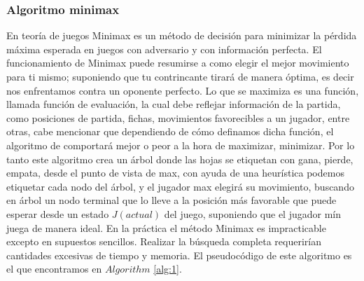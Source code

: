 \documentclass[runningheads]{llncs}
\begin{document}
\subsubsection{Algoritmo minimax}
En teoría de juegos Minimax es un método de decisión para minimizar la pérdida máxima esperada en juegos con adversario y con información perfecta. El funcionamiento de Minimax puede resumirse a como elegir el mejor movimiento para ti mismo; suponiendo que tu contrincante tirará de manera óptima, es decir nos enfrentamos contra un oponente perfecto. Lo que se maximiza es una función, llamada función de evaluación, la cual debe reflejar información de la partida, como posiciones de partida, fichas, movimientos favorecibles a un jugador, entre otras, cabe mencionar que dependiendo de cómo definamos dicha función, el algoritmo de comportará mejor o peor a la hora de maximizar, minimizar. Por lo tanto este algoritmo crea un árbol donde las hojas se etiquetan con gana, pierde, empata, desde el punto de vista de max, con ayuda de una heurística podemos etiquetar cada nodo del árbol, y el jugador max elegirá su movimiento, buscando en árbol un nodo terminal que lo lleve a la posición más favorable que puede esperar desde un estado $J(actual)$ del juego,  suponiendo que el jugador mín juega de manera ideal.
En la práctica el método Minimax es impracticable excepto en supuestos sencillos. Realizar la búsqueda completa requerirían cantidades excesivas de tiempo y memoria. El pseudocódigo de este algoritmo es el que encontramos en $Algorithm$ \ref{alg:1}.
\end{document}
